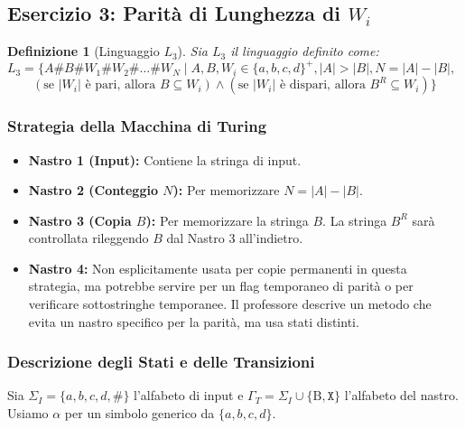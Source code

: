 \documentclass[a4paper]{article}
\newtheorem{definition}{Definizione}
\newcommand{\B}{\text{B}} %
\begin{document}
\subsection{Esercizio 3: Parità di Lunghezza di $W_i$}

\begin{definition}[Linguaggio $L_3$]
Sia $L_3$ il linguaggio definito come:
$L_3 = \{A\texttt{\#}B\texttt{\#}W_1 \texttt{\#} W_2 \texttt{\#} \dots \texttt{\#} W_N \mid A, B, W_i \in \{a,b,c,d\}^+, |A| > |B|, N = |A| - |B|, $
$\qquad (\text{se } |W_i| \text{ è pari, allora } B \subseteq W_i) \land (\text{se } |W_i| \text{ è dispari, allora } B^R \subseteq W_i) \}$
\end{definition}

\subsubsection{Strategia della Macchina di Turing}
\begin{itemize}
    \item \textbf{Nastro 1 (Input):} Contiene la stringa di input.
    \item \textbf{Nastro 2 (Conteggio $N$):} Per memorizzare $N = |A| - |B|$.
    \item \textbf{Nastro 3 (Copia $B$):} Per memorizzare la stringa $B$. La stringa $B^R$ sarà controllata rileggendo $B$ dal Nastro 3 all'indietro.
    \item \textbf{Nastro 4:} Non esplicitamente usata per copie permanenti in questa strategia, ma potrebbe servire per un flag temporaneo di parità o per verificare sottostringhe temporanee. Il professore descrive un metodo che evita un nastro specifico per la parità, ma usa stati distinti.
\end{itemize}

\subsubsection{Descrizione degli Stati e delle Transizioni}
Sia $\Sigma_I = \{a,b,c,d,\texttt{\#}\}$ l'alfabeto di input e $\Gamma_T = \Sigma_I \cup \{\B, \texttt{X}\}$ l'alfabeto del nastro. Usiamo $\alpha$ per un simbolo generico da $\{a,b,c,d\}$.
\end{document}

